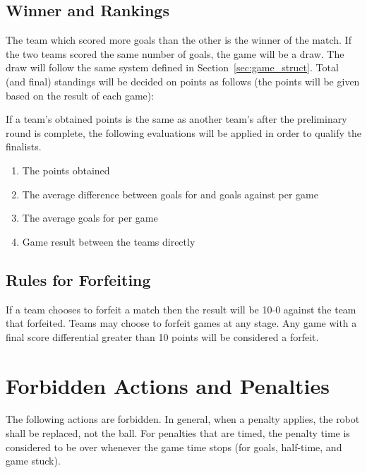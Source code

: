 \documentclass[12pt]{article}
\begin{document}
\subsection{Winner and Rankings}

The team which scored more goals than the other is the winner of the match. If the two teams scored the same number of goals, the game will be a draw. The draw will follow the same system defined in Section~\ref{sec:game_struct}. Total (and final) standings will be decided on points as follows (the points will be given based on the result of each game):


If a team's obtained points is the same as another team's after the preliminary round is complete, the following evaluations will be applied in order to qualify the finalists.

\begin{enumerate}

\item The points obtained

\item The average difference between goals for and goals against per game

\item The average goals for per game

\item Game result between the teams directly

\end{enumerate}

\subsection{Rules for Forfeiting}

If a team chooses to forfeit a match then the result will be 10-0 against the team that forfeited. Teams may choose to forfeit games at any stage. Any game with a final score differential greater than 10 points will be considered a forfeit.

\section{Forbidden Actions and Penalties}
\label{sec:forbidden_act}

The following actions are forbidden. In general, when a penalty applies, the robot shall be replaced, not the ball. For penalties that are timed, the penalty time is considered to be over whenever the game time stops (for goals, half-time, and game stuck).
\end{document}
